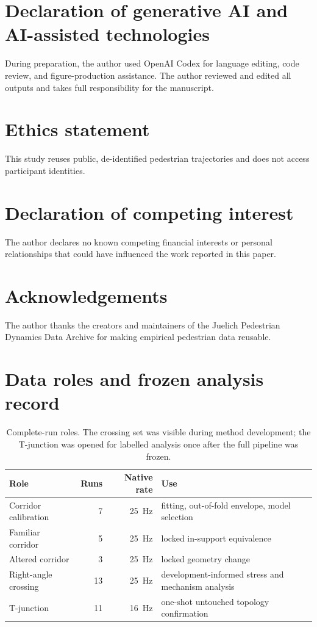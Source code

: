 \documentclass[preprint,11pt,authoryear]{elsarticle}
\begin{document}
\section*{Declaration of generative AI and AI-assisted technologies}
During preparation, the author used OpenAI Codex for language editing, code review, and figure-production assistance. The author reviewed and edited all outputs and takes full responsibility for the manuscript.

\section*{Ethics statement}
This study reuses public, de-identified pedestrian trajectories and does not access participant identities.

\section*{Declaration of competing interest}
The author declares no known competing financial interests or personal relationships that could have influenced the work reported in this paper.

\section*{Acknowledgements}
The author thanks the creators and maintainers of the Juelich Pedestrian Dynamics Data Archive for making empirical pedestrian data reusable.

\appendix
{}
\renewcommand{\thetable}{\Alph{section}.\arabic{table}}
\renewcommand{\thefigure}{\Alph{section}.\arabic{figure}}

\section{Data roles and frozen analysis record}
\label{app:runs}
\begin{table}[!htbp]
\centering
\caption{Complete-run roles. The crossing set was visible during method development; the T-junction was opened for labelled analysis once after the full pipeline was frozen.}
\label{tab:data-roles}
\small
\renewcommand{\arraystretch}{1.08}
\begin{tabularx}{\textwidth}{lrrX}
\toprule
Role & Runs & Native rate & Use \\
\midrule
Corridor calibration & 7 & 25~Hz & fitting, out-of-fold envelope, model selection \\
Familiar corridor & 5 & 25~Hz & locked in-support equivalence \\
Altered corridor & 3 & 25~Hz & locked geometry change \\
Right-angle crossing & 13 & 25~Hz & development-informed stress and mechanism analysis \\
T-junction & 11 & 16~Hz & one-shot untouched topology confirmation \\
\bottomrule
\end{tabularx}
\end{table}
\end{document}
